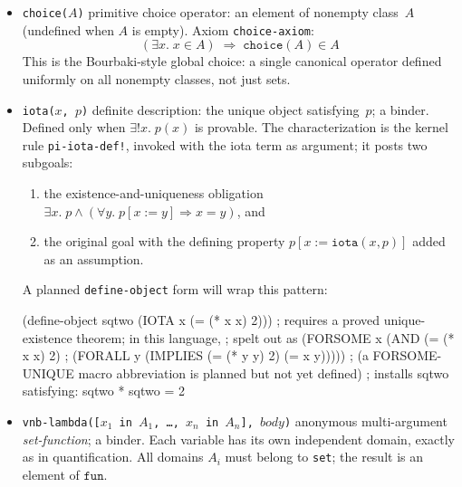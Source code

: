 \begin{itemize}
\begin{itemize}
  \end{itemize}
  The notation $\{a,b,c,\ldots\}$ is sugar for $\texttt{make-set}([a,b,c,\ldots])$;
  repetitions are harmless.
\item \texttt{choice($A$)} primitive choice operator: an element of nonempty class~$A$
  (undefined when $A$ is empty).  Axiom \texttt{choice-axiom}:
  \[
    (\exists x.\; x \in A) \;\Longrightarrow\; \texttt{choice}(A) \in A
  \]
  This is the Bourbaki-style global choice: a single canonical operator
  defined uniformly on all nonempty classes, not just sets.
\item \texttt{iota($x$, $p$)} definite description: the unique object satisfying~$p$;
  a binder.  Defined only when $\exists! x.\; p(x)$ is provable.  The
  characterization is the kernel rule \texttt{pi-iota-def!}, invoked
  with the iota term as argument; it posts two subgoals:
  \begin{enumerate}[label=(\arabic*),leftmargin=1.2cm]
  \item the existence-and-uniqueness obligation
    $\exists x.\;p \land (\forall y.\; p[x:=y] \Rightarrow x = y)$, and
  \item the original goal with the defining property
    $p[x := \texttt{iota}(x, p)]$ added as an assumption.
  \end{enumerate}
  A planned \texttt{define-object} form will wrap this pattern:
\begin{VNBsnip}
(define-object sqtwo (IOTA x (= (* x x) 2)))
; requires a proved unique-existence theorem; in this language,
; spelt out as (FORSOME x (AND (= (* x x) 2)
;                              (FORALL y (IMPLIES (= (* y y) 2) (= x y)))))
; (a FORSOME-UNIQUE macro abbreviation is planned but not yet defined)
; installs sqtwo satisfying: sqtwo * sqtwo = 2
\end{VNBsnip}
\item \texttt{vnb-lambda([$x_1$ in $A_1$, \ldots, $x_n$ in $A_n$], $\mathit{body}$)}
  anonymous multi-argument \emph{set-function}; a binder.
  Each variable has its own independent domain, exactly as in quantification.
  All domains $A_i$ must belong to \texttt{set}; the result is an element
  of $\mathtt{fun}$.


\end{itemize}
